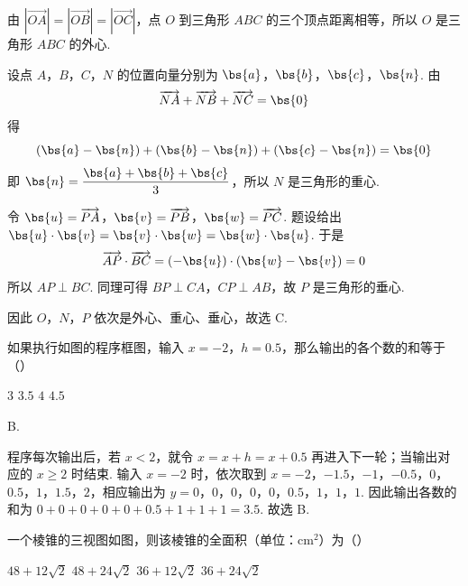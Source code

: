 \begin{solution}
由 \(|\overrightarrow{OA}|=|\overrightarrow{OB}|=|\overrightarrow{OC}|\)，点 \(O\) 到三角形 \(ABC\) 的三个顶点距离相等，所以 \(O\) 是三角形 \(ABC\) 的外心.

设点 \(A\)，\(B\)，\(C\)，\(N\) 的位置向量分别为 \(\bs{a}\)，\(\bs{b}\)，\(\bs{c}\)，\(\bs{n}\). 由
\[
\overrightarrow{NA}+\overrightarrow{NB}+\overrightarrow{NC}=\bs{0}
\]
得
\[
(\bs{a}-\bs{n})+(\bs{b}-\bs{n})+(\bs{c}-\bs{n})=\bs{0}
\]
即 \(\bs{n}=\dfrac{\bs{a}+\bs{b}+\bs{c}}{3}\)，所以 \(N\) 是三角形的重心.

令 \(\bs{u}=\overrightarrow{PA}\)，\(\bs{v}=\overrightarrow{PB}\)，\(\bs{w}=\overrightarrow{PC}\). 题设给出
\(\bs{u}\cdot\bs{v}=\bs{v}\cdot\bs{w}=\bs{w}\cdot\bs{u}\). 于是
\[
\overrightarrow{AP}\cdot\overrightarrow{BC}=(-\bs{u})\cdot(\bs{w}-\bs{v})=0
\]
所以 \(AP\perp BC\). 同理可得 \(BP\perp CA\)，\(CP\perp AB\)，故 \(P\) 是三角形的垂心.

因此 \(O\)，\(N\)，\(P\) 依次是外心、重心、垂心，故选 C.
\end{solution}

\begin{problem}
如果执行如图的程序框图，输入 \(x = -2\)，\(h = 0.5\)，那么输出的各个数的和等于（\quad）


\choices
    {\(3\)}
    {\(3.5\)}
    {\(4\)}
    {\(4.5\)}
\end{problem}

\begin{answer}
B.
\end{answer}

\begin{solution}
程序每次输出后，若 \(x<2\)，就令 \(x=x+h=x+0.5\) 再进入下一轮；当输出对应的 \(x\geqslant2\) 时结束. 输入 \(x=-2\) 时，依次取到
\(x=-2\)，\(-1.5\)，\(-1\)，\(-0.5\)，\(0\)，\(0.5\)，\(1\)，\(1.5\)，\(2\)，相应输出为
\(y=0\)，\(0\)，\(0\)，\(0\)，\(0\)，\(0.5\)，\(1\)，\(1\)，\(1\).
因此输出各数的和为
\(0+0+0+0+0+0.5+1+1+1=3.5\).
故选 B.
\end{solution}

\begin{problem}
一个棱锥的三视图如图，则该棱锥的全面积（单位：\(\mathrm{cm}^2\)）为（\quad）


\choices
    {\(48 + 12\sqrt{2}\)}
    {\(48 + 24\sqrt{2}\)}
    {\(36 + 12\sqrt{2}\)}
    {\(36 + 24\sqrt{2}\)}
\end{problem}

